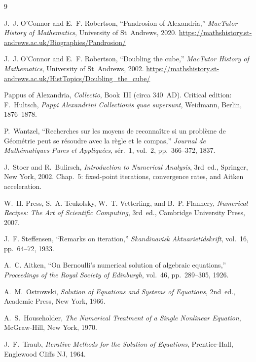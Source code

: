 \documentclass[11pt,a4paper]{article}
\theoremstyle{definition}
\begin{document}
\begin{thebibliography}{9}

J.~J. O'Connor and E.~F. Robertson,
``Pandrosion of Alexandria,''
\textit{MacTutor History of Mathematics}, University of St~Andrews, 2020.
\url{https://mathshistory.st-andrews.ac.uk/Biographies/Pandrosion/}

J.~J. O'Connor and E.~F. Robertson,
``Doubling the cube,''
\textit{MacTutor History of Mathematics}, University of St~Andrews, 2002.
\url{https://mathshistory.st-andrews.ac.uk/HistTopics/Doubling_the_cube/}

Pappus of Alexandria,
\textit{Collectio}, Book~III (circa 340~AD).
Critical edition: F.~Hultsch, \textit{Pappi Alexandrini Collectionis quae supersunt},
Weidmann, Berlin, 1876--1878.

P.~Wantzel,
``Recherches sur les moyens de reconna\^itre si un probl\`eme de G\'eom\'etrie peut se r\'esoudre avec la r\`egle et le compas,''
\textit{Journal de Math\'ematiques Pures et Appliqu\'ees}, s\'er.~1, vol.~2, pp.~366--372, 1837.

J.~Stoer and R.~Bulirsch,
\textit{Introduction to Numerical Analysis},
3rd~ed., Springer, New York, 2002.
Chap.~5: fixed-point iterations, convergence rates, and Aitken acceleration.

W.~H. Press, S.~A. Teukolsky, W.~T. Vetterling, and B.~P. Flannery,
\textit{Numerical Recipes: The Art of Scientific Computing},
3rd~ed., Cambridge University Press, 2007.

J.~F. Steffensen,
``Remarks on iteration,''
\textit{Skandinavisk Aktuarietidskrift}, vol.~16, pp.~64--72, 1933.

A.~C. Aitken,
``On Bernoulli's numerical solution of algebraic equations,''
\textit{Proceedings of the Royal Society of Edinburgh}, vol.~46, pp.~289--305, 1926.

A.~M.~Ostrowski,
\textit{Solution of Equations and Systems of Equations},
2nd~ed., Academic Press, New York, 1966.

A.~S.~Householder,
\textit{The Numerical Treatment of a Single Nonlinear Equation},
McGraw-Hill, New York, 1970.

J.~F.~Traub,
\textit{Iterative Methods for the Solution of Equations},
Prentice-Hall, Englewood Cliffs NJ, 1964.


\end{thebibliography}
\end{document}
